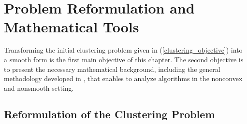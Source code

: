 \chapter{Problem Reformulation and Mathematical Tools} \label{Chptr2}

\noindent \noindent \hrulefill

Transforming the initial clustering problem given in (\ref{clustering_objective}) into a smooth form is the first main objective of this chapter. The second objective is to present the necessary mathematical background, including the general methodology developed in \cite{BST2014}, that enables to analyze algorithms in the nonconvex and nonsmooth setting. 

\noindent \noindent \hrulefill

\section{Reformulation of the Clustering Problem} \label{State_Clustering_Reformulation}

